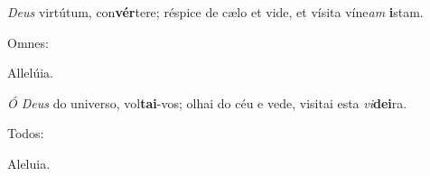 \begin{greenumerate}
  \setcounter{enumi}{1}


  \item \textit{Deus} virtútum, con\textbf{vér}tere; {\GreStar} réspice de cælo et vide, et vísita víne\textit{am} \textbf{i}stam. \begin{rubrica}Omnes:\end{rubrica} Allelúia.

  \switchcolumn\setcounter{enumi}{1}

  \item \textit{Ó Deus} do universo, vol\textbf{tai}-vos; {\GreStar} olhai do céu e vede, visitai esta \textit{vi}\textbf{dei}ra. \begin{rubrica}Todos:\end{rubrica} Aleluia.
\end{greenumerate}